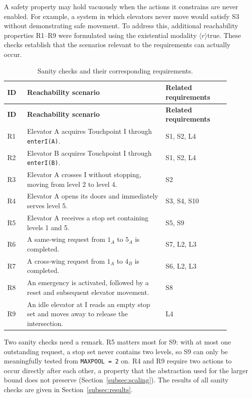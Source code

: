 A safety property may hold vacuously when the actions it constrains are never enabled. For example, a system in which elevators never move would satisfy S3 without demonstrating safe movement. To address this, additional reachability properties R1--R9 were formulated using the existential modality \(\langle r\rangle\mathrm{true}\). These checks establish that the scenarios relevant to the requirements can actually occur.

\begingroup
\small
\renewcommand{\arraystretch}{1.15}
\begin{longtable}{@{}p{0.08\linewidth}p{0.57\linewidth}p{0.26\linewidth}@{}}
  \caption{Sanity checks and their corresponding requirements.}\label{tab:sanity-checks}\\
  \toprule
  \textbf{ID} & \textbf{Reachability scenario} & \textbf{Related requirements}\\
  \midrule
  \endfirsthead
  \toprule
  \textbf{ID} & \textbf{Reachability scenario} & \textbf{Related requirements}\\
  \midrule
  \endhead
  \bottomrule
  \endfoot
  R1 & Elevator A acquires Touchpoint I through \texttt{enterI(A)}. & S1, S2, L4\\
  R2 & Elevator B acquires Touchpoint I through \texttt{enterI(B)}. & S1, S2, L4\\
  R3 & Elevator A crosses I without stopping, moving from level 2 to level 4. & S2\\
  R4 & Elevator A opens its doors and immediately serves level 5. & S3, S4, S10\\
  R5 & Elevator A receives a stop set containing levels 1 and 5. & S5, S9\\
  R6 & A same-wing request from \(1_A\) to \(5_A\) is completed. & S7, L2, L3\\
  R7 & A cross-wing request from \(1_A\) to \(4_B\) is completed. & S6, L2, L3\\
  R8 & An emergency is activated, followed by a reset and subsequent elevator movement. & S8\\
  R9 & An idle elevator at I reads an empty stop set and moves away to release the intersection. & L4\\
\end{longtable}
\endgroup

\newpage

Two sanity checks need a remark. R5 matters most for S9: with at most one outstanding request, a stop set never contains two levels, so S9 can only be meaningfully tested from \texttt{MAXPOOL = 2} on. R4 and R9 require two actions to occur directly after each other, a property that the abstraction used for the larger bound does not preserve (Section~\ref{subsec:scaling}). The results of all sanity checks are given in Section~\ref{subsec:results}.

